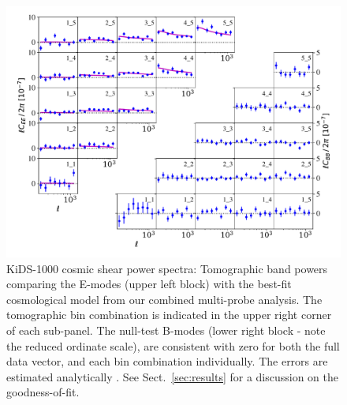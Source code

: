 \begin{figure}
        \includegraphics[width=\textwidth]{Data_Plots/Pkk/Pkk_K1000_2Dbins_v2_goldclasses_Flag_SOM_Fid_A.pdf}
        \caption{KiDS-1000 cosmic shear power spectra:  Tomographic
          band powers comparing the E-modes (upper left block) with the best-fit
          cosmological model from our combined multi-probe analysis.  The tomographic
        bin combination is indicated in the upper right corner of each
      sub-panel.  The null-test B-modes (lower right block - note the reduced ordinate scale), are
      consistent with zero for both the full data vector, and each
     bin combination individually.   The errors are estimated analytically \citep{joachimi/etal:inprep}.  See Sect.~\ref{sec:results} for a discussion on the goodness-of-fit. }
        \label{fig:Pkk}
\end{figure}


